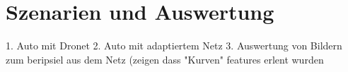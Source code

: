 %
\chapter{Szenarien und Auswertung}


1. Auto mit Dronet 
2. Auto mit adaptiertem Netz
3. Auswertung von Bildern zum beripsiel aus dem Netz (zeigen dass "Kurven" features erlent wurden